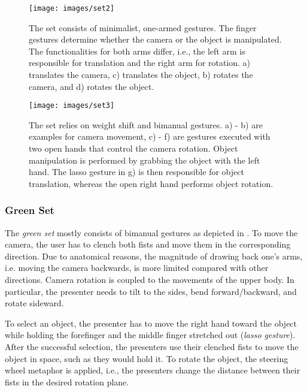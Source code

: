 \documentclass{sigchi}
\begin{document}
\begin{figure}[t]
\centering
\texttt{[image: images/set2]}
\vskip-1mm
\caption{The set consists of minimalist, one-armed gestures. The finger gestures determine whether the camera or the object is manipulated. The functionalities for both arms differ, i.e., the left arm is responsible for translation and the right arm for rotation. a) translates the camera, c) translates the object, b) rotates the camera, and d) rotates the object.}
\label{fig:set2}
\end{figure}

\begin{figure}[t]
\centering
\texttt{[image: images/set3]}
\vskip-1mm
\caption{The set relies on weight shift and bimanual gestures. a) - b) are examples for camera movement, c) - f) are gestures executed with two open hands that control the camera rotation. Object manipulation is performed by grabbing the object with the left hand. The lasso gesture in g) is then responsible for object translation, whereas the open right hand performs object rotation.}
\label{fig:set3}
\end{figure}



\subsubsection{Green Set}
The \textit{green set} mostly consists of bimanual gestures as depicted in . To move the camera, the user has to clench both fists and move them in the corresponding direction. Due to anatomical reasons, the magnitude of drawing back one's arms, i.e. moving the camera backwards, is more limited compared with other directions. Camera rotation is coupled to the movements of the upper body. In particular, the presenter needs to tilt to the sides, bend forward/backward, and rotate sideward.


To select an object, the presenter has to move the right hand toward the object while holding the forefinger and the middle finger stretched out (\textit{lasso gesture}). After the successful selection, the presenters use their clenched fists to move the object in space, such as they would hold it. To rotate the object, the steering wheel metaphor is applied, i.e., the presenters change the distance between their fists in the desired rotation plane.



\end{document}
